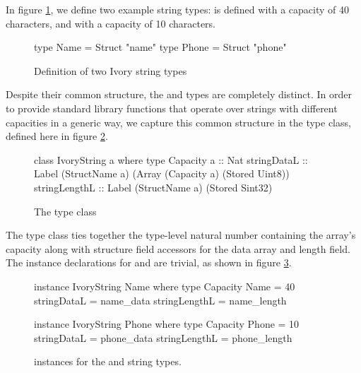 In figure \ref{ivory-string-type-defn}, we define two example
string types:  is defined with a capacity of 40
characters, and  with a capacity of 10 characters.

\begin{figure}[h]
\begin{code}

type Name  = Struct "name"
type Phone = Struct "phone"
\end{code}
\caption{Definition of two Ivory string types}
\label{ivory-string-type-defn}
\end{figure}

Despite their common structure, the  and  types
are completely distinct. In order to provide standard library
functions that operate over strings with different capacities in a generic
way, we capture this common structure in the  type
class, defined here in figure \ref{ivory-string-class}.

\begin{figure}[h]
\begin{code}
class IvoryString a where
  type Capacity a :: Nat
  stringDataL   :: Label (StructName a)
                         (Array (Capacity a)
                                (Stored Uint8))
  stringLengthL :: Label (StructName a)
                         (Stored Sint32)
\end{code}
\caption{The  type class}
\label{ivory-string-class}
\end{figure}

The  type class ties together the type-level natural
number containing the array's capacity %
along with structure field accessors
for the data array and length field. The instance declarations for 
and  are trivial, as shown in figure \ref{ivory-string-instances}.

\begin{figure}[h]
\begin{code}
instance IvoryString Name where
  type Capacity Name = 40
  stringDataL = name_data
  stringLengthL = name_length

instance IvoryString Phone where
  type Capacity Phone = 10
  stringDataL = phone_data
  stringLengthL = phone_length
\end{code}
\caption{ instances for the  and 
string types.}
\label{ivory-string-instances}
\end{figure}

